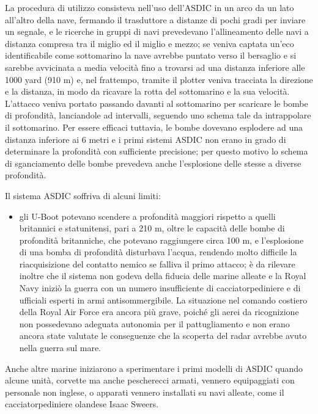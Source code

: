 La procedura di utilizzo consisteva nell'uso dell'ASDIC in un arco da un lato all'altro della nave, fermando il trasduttore a distanze di pochi gradi per inviare un segnale, e le ricerche in gruppi di navi prevedevano l'allineamento delle navi a distanza compresa tra il miglio ed il miglio e mezzo; se veniva captata un'eco identificabile come sottomarino la nave avrebbe puntato verso il bersaglio e si sarebbe avvicinata a media velocità fino a trovarsi ad una distanza inferiore alle 1000 yard (910 m) e, nel frattempo, tramite il plotter veniva tracciata la direzione e la distanza, in modo da ricavare la rotta del sottomarino e la sua velocità. 
L'attacco veniva portato passando davanti al sottomarino per scaricare le bombe di profondità, lanciandole ad intervalli, seguendo uno schema tale da intrappolare il sottomarino. 
Per essere efficaci tuttavia, le bombe dovevano esplodere ad una distanza inferiore ai 6 metri e i primi sistemi ASDIC non erano in grado di determinare la profondità con sufficiente precisione; per questo motivo lo schema di sganciamento delle bombe prevedeva anche l'esplosione delle stesse a diverse profondità.

Il sistema ASDIC soffriva di alcuni limiti:
\begin{itemize}
\item gli U-Boot potevano scendere a profondità maggiori rispetto a quelli britannici e statunitensi, pari a 210 m, oltre le capacità delle bombe di profondità britanniche, che potevano raggiungere circa 100 m, e l'esplosione di una bomba di profondità disturbava l'acqua, rendendo molto difficile la riacquisizione del contatto nemico se falliva il primo attacco; è da rilevare inoltre che il sistema non godeva della fiducia delle marine alleate e la Royal Navy iniziò la guerra con un numero insufficiente di cacciatorpediniere e di ufficiali esperti in armi antisommergibile. La situazione nel comando costiero della Royal Air Force era ancora più grave, poiché gli aerei da ricognizione non possedevano adeguata autonomia per il pattugliamento e non erano ancora state valutate le conseguenze che la scoperta del radar avrebbe avuto nella guerra sul mare.
\end{itemize}

Anche altre marine iniziarono a sperimentare i primi modelli di ASDIC quando alcune unità, corvette ma anche pescherecci armati, vennero equipaggiati con personale non inglese, o apparati vennero installati su navi alleate, come il cacciatorpediniere olandese Isaac Sweers.

